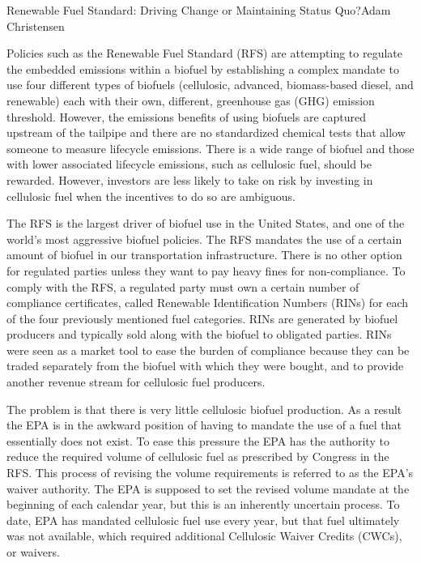 \documentclass[10pt]{papertex}
\begin{document}
\begin{news}{2}{Renewable Fuel Standard: Driving Change or Maintaining Status 
    Quo?}{Adam Christensen}{}{}

Policies such as the Renewable Fuel Standard (RFS) are attempting to regulate 
the embedded emissions within a biofuel by establishing a complex mandate to 
use four different types of biofuels (cellulosic, advanced, biomass-based 
diesel, and renewable) each with their own, different, greenhouse gas (GHG) 
emission threshold. However, the emissions benefits of using biofuels are 
captured upstream of the tailpipe and there are no standardized chemical tests 
that allow someone to measure lifecycle emissions. There is a wide range of 
biofuel and those with lower associated lifecycle emissions, such as cellulosic 
fuel, should be rewarded. However, investors are less likely to take on risk 
by investing in cellulosic fuel when the incentives to do so are ambiguous.

The RFS is the largest driver of biofuel use in the United States, and one of 
the world’s most aggressive biofuel policies. The RFS mandates the use of a 
certain amount of biofuel in our transportation infrastructure. There is no 
other option for regulated parties unless they want to pay heavy fines for 
non-compliance. To comply with the RFS, a regulated party must own a certain 
number of compliance certificates, called Renewable Identification Numbers 
(RINs) for each of the four previously mentioned fuel categories. RINs are 
generated by biofuel producers and typically sold along with the biofuel to 
obligated parties. RINs were seen as a market tool to ease the burden of 
compliance because they can be traded separately from the biofuel with which 
they were bought, and to provide another revenue stream for cellulosic fuel 
producers.

The problem is that there is very little cellulosic biofuel production. As a 
result the EPA is in the awkward position of having to mandate the use of a 
fuel that essentially does not exist. To ease this pressure the EPA has the 
authority to reduce the required volume of cellulosic fuel as prescribed by 
Congress in the RFS. This process of revising the volume requirements is 
referred to as the EPA’s waiver authority. The EPA is supposed to set the 
revised volume mandate at the beginning of each calendar year, but this is an 
inherently uncertain process. To date, EPA has mandated cellulosic fuel use 
every year, but that fuel ultimately was not available, which required 
additional Cellulosic Waiver Credits (CWCs), or waivers.


\end{news}
\end{document}
